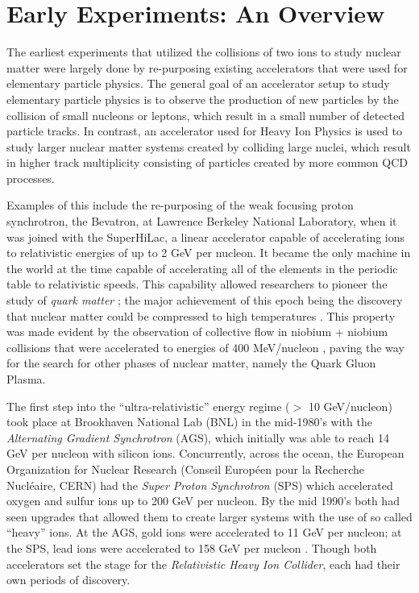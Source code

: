 \section{Early Experiments: An Overview} \label{sect:earlyexperiments}
The earliest experiments that utilized the collisions of two ions to study nuclear matter were largely done by re-purposing existing accelerators that were used for elementary particle physics. The general goal of an accelerator setup to study elementary particle physics is to observe the production of new particles by the collision of small nucleons or leptons, which result in a small number of detected particle tracks. In contrast, an accelerator used for Heavy Ion Physics is used to study larger nuclear matter systems created by colliding large nuclei, which result in higher track multiplicity consisting of particles created by more common QCD processes. 

Examples of this include the re-purposing of the weak focusing proton synchrotron, the Bevatron, at Lawrence Berkeley National Laboratory, when it was joined with the SuperHiLac, a linear accelerator capable of accelerating ions to relativistic energies of up to 2 GeV per nucleon. It became the only machine in the world at the time capable of accelerating all of the elements in the periodic table to relativistic speeds. This capability allowed researchers to pioneer the study of \textit{quark matter} \citep{bevalac9lives}; the major achievement of this epoch being the discovery that nuclear matter could be compressed to high temperatures \citep{ROBINSON857}. This property was made evident by the observation of collective flow in niobium + niobium collisions that were accelerated to energies of 400 MeV/nucleon \citep{PhysRevLett.52.1590}, paving the way for the search for other phases of nuclear matter, namely the Quark Gluon Plasma.

The first step into the ``ultra-relativistic'' energy regime ($>$ 10 GeV/nucleon) took place at Brookhaven National Lab (BNL) in the mid-1980's with the \textit{Alternating Gradient Synchrotron} (AGS), which initially was able to reach 14 GeV per nucleon with silicon ions. Concurrently, across the ocean, the European Organization for Nuclear Research (Conseil Europ\'{e}en pour la Recherche Nucl\'{e}aire, CERN) had the \textit{Super Proton Synchrotron} (SPS) which accelerated oxygen and sulfur ions up to 200 GeV per nucleon. By the mid 1990's both had seen upgrades that allowed them to create larger systems with the use of so called ``heavy'' ions. At the AGS, gold ions were accelerated to 11 GeV per nucleon; at the SPS, lead ions were accelerated to 158 GeV per nucleon \citep{wojciechphenomenology}. Though both accelerators set the stage for the \textit{Relativistic Heavy Ion Collider}, each had their own periods of discovery. 

